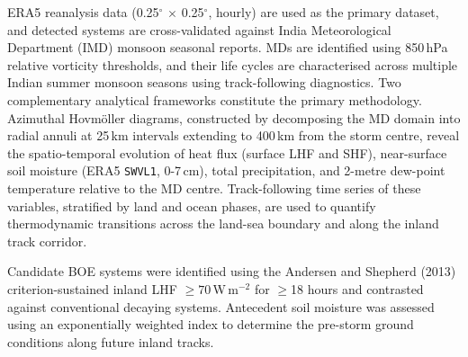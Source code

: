 \documentclass[12pt]{article}
\begin{document}
\noindent ERA5 reanalysis data (0.25\(^\circ\) $\times$ 0.25\(^\circ\), hourly) are used as the primary dataset, and detected systems are cross-validated against India Meteorological Department (IMD) monsoon seasonal reports. MDs are identified using 850\,hPa relative vorticity thresholds, and their life cycles are characterised across multiple Indian summer monsoon seasons using track-following diagnostics. Two complementary analytical frameworks constitute the primary methodology. Azimuthal Hovm\"{o}ller diagrams, constructed by decomposing the MD domain into radial annuli at 25\,km intervals extending to 400\,km from the storm centre, reveal the spatio-temporal evolution of heat flux (surface LHF and SHF), near-surface soil moisture (ERA5 \texttt{SWVL1}, 0-7\,cm), total precipitation, and 2-metre dew-point temperature relative to the MD centre. Track-following time series of these variables, stratified by land and ocean phases, are used to quantify thermodynamic transitions across the land-sea boundary and along the inland track corridor.

\vspace{0.3cm}

\noindent Candidate BOE systems were identified using the Andersen and Shepherd (2013) criterion-sustained inland LHF $\geq 70$\,W\,m$^{-2}$ for $\geq$18 hours and contrasted against conventional decaying systems. Antecedent soil moisture was assessed using an exponentially weighted index to determine the pre-storm ground conditions along future inland tracks.

\vspace{0.3cm}
\end{document}
